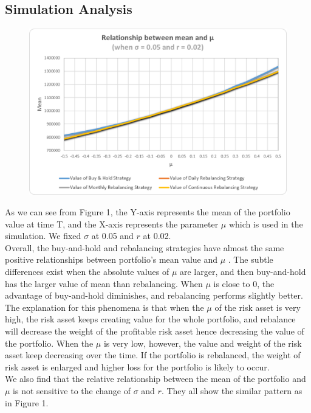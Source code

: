 \documentclass[
10pt, %
a4paper, %
oneside, %
headinclude,footinclude, %
BCOR5mm, %
]{scrartcl}
\begin{document}
\subsection{Simulation Analysis}
\begin{figure}[h]
	\centering
	\includegraphics[width=0.7\linewidth]{mean_mu_005_002}
	\caption{}
	\label{fig:meanmu005002}
\end{figure}
As we can see from Figure 1, the Y-axis represents the mean of the portfolio value at time T, and the X-axis represents the parameter $\mu$ which is used in the simulation. We fixed $\sigma$ at 0.05 and $r$ at 0.02.\\

Overall, the buy-and-hold and rebalancing strategies have almost the same positive relationships between portfolio's mean value and $\mu$ . The subtle differences exist when the absolute values of $\mu$ are larger, and then buy-and-hold has the larger value of mean than rebalancing. When $\mu$ is close to 0, the advantage of buy-and-hold diminishes, and rebalancing performs slightly better.\\

The explanation for this phenomena is that when the $\mu$ of the risk asset is very high, the risk asset keeps creating value for the whole portfolio, and rebalance will decrease the weight of the profitable risk asset hence decreasing the value of the portfolio. When the $\mu$ is very low, however, the value and weight of the risk asset keep decreasing over the time. If the portfolio is rebalanced, the weight of risk asset is enlarged and higher loss for the portfolio is likely to occur.\\

We also find that the relative relationship between the mean of the portfolio and $\mu$ is not sensitive to the change of $\sigma$ and $r$. They all show the similar pattern as in Figure 1.\\
\end{document}
